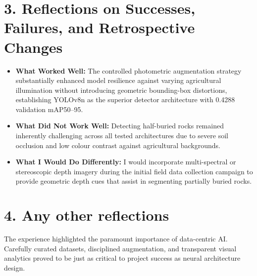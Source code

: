\documentclass[11pt, a4paper]{article}
\begin{document}
\section*{3. Reflections on Successes, Failures, and Retrospective Changes}
\begin{itemize}
    \item \textbf{What Worked Well:} The controlled photometric augmentation strategy substantially enhanced model resilience against varying agricultural illumination without introducing geometric bounding-box distortions, establishing YOLOv8n as the superior detector architecture with 0.4288 validation mAP50--95.
    \item \textbf{What Did Not Work Well:} Detecting half-buried rocks remained inherently challenging across all tested architectures due to severe soil occlusion and low colour contrast against agricultural backgrounds.
    \item \textbf{What I Would Do Differently:} I would incorporate multi-spectral or stereoscopic depth imagery during the initial field data collection campaign to provide geometric depth cues that assist in segmenting partially buried rocks.
\end{itemize}

\section*{4. Any other reflections}
The experience highlighted the paramount importance of data-centric AI. Carefully curated datasets, disciplined augmentation, and transparent visual analytics proved to be just as critical to project success as neural architecture design.
\end{document}

